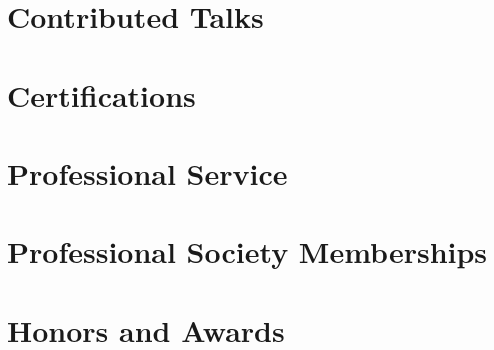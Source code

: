 \documentclass[margin,centered]{res}
\begin{document}
\begin{resume}
\section{\sc Contributed Talks}





\section{\sc Certifications} 








\section{\sc Professional Service} 





\section{\sc Professional Society Memberships} 



\section{\sc Honors and Awards} 







\end{resume}
\end{document}
